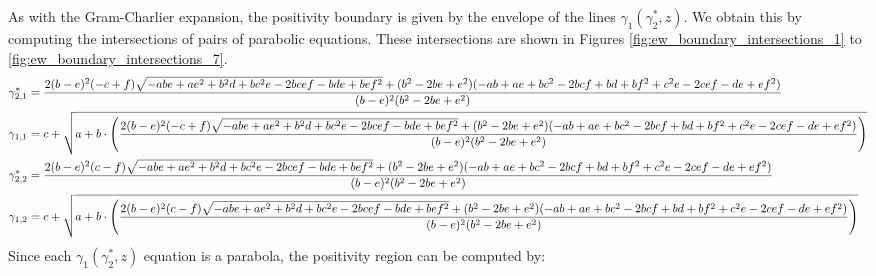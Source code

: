 As with the Gram-Charlier expansion, the positivity boundary is given by the envelope of the lines $\gamma_1(\gamma_2^*, z)$. We obtain this by computing the intersections of pairs of parabolic equations. These intersections are shown in Figures \ref{fig:ew_boundary_intersections_1} to \ref{fig:ew_boundary_intersections_7}.
\begin{align}
    \gamma_{2,1}^* &= \frac{2(b - e)^2(-c + f)\sqrt{-ab e + ae^2 + b^2 d + b c^2 e - 2 b c ef - bd e + b e f^2} + (b^2 - 2be + e^2)(-ab + ae + bc^2 - 2bcf + bd + bf^2 + c^2e - 2cef - de + ef^2)}{(b - e)^2(b^2 - 2be + e^2)} \notag \\
    \gamma_{1,1} &= c + \sqrt{a + b \cdot \left(\frac{2(b - e)^2(-c + f)\sqrt{-ab e + ae^2 + b^2 d + b c^2 e - 2 b c ef - bd e + b e f^2} + (b^2 - 2be + e^2)(-ab + ae + bc^2 - 2bcf + bd + bf^2 + c^2e - 2cef - de + ef^2)}{(b - e)^2(b^2 - 2be + e^2)}\right)} \notag \\
    \gamma_{2,2}^* &= \frac{2(b - e)^2(c - f)\sqrt{-ab e + ae^2 + b^2 d + b c^2 e - 2 b c ef - bd e + b e f^2} + (b^2 - 2be + e^2)(-ab + ae + bc^2 - 2bcf + bd + bf^2 + c^2e - 2cef - de + ef^2)}{(b - e)^2(b^2 - 2be + e^2)} \notag \\
    \gamma_{1,2} &= c + \sqrt{a + b \cdot \left(\frac{2(b - e)^2(c - f)\sqrt{-ab e + ae^2 + b^2 d + b c^2 e - 2 b c ef - bd e + b e f^2} + (b^2 - 2be + e^2)(-ab + ae + bc^2 - 2bcf + bd + bf^2 + c^2e - 2cef - de + ef^2)}{(b - e)^2(b^2 - 2be + e^2)}\right)} \notag
\end{align}
Since each $\gamma_1(\gamma_2^*, z)$ equation is a parabola, the positivity region can be computed by:

